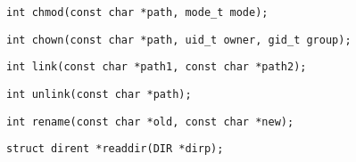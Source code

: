 %
\begin{verbatim}
int chmod(const char *path, mode_t mode);
\end{verbatim}

\begin{verbatim}
int chown(const char *path, uid_t owner, gid_t group);
\end{verbatim}

\begin{verbatim}
int link(const char *path1, const char *path2);
\end{verbatim}

\begin{verbatim}
int unlink(const char *path);
\end{verbatim}

\begin{verbatim}
int rename(const char *old, const char *new);
\end{verbatim}

\begin{verbatim}
struct dirent *readdir(DIR *dirp);
\end{verbatim}

